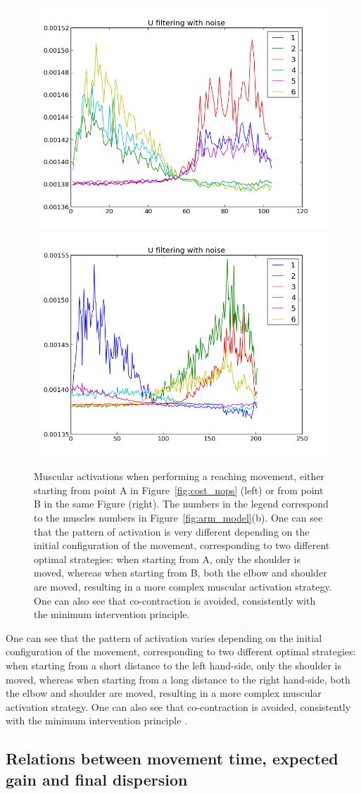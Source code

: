 \documentclass[10pt]{article}
\begin{document}
\begin{figure}[htp]
  \centering
\includegraphics[width=.449\columnwidth]{images/muscles_right2}
\includegraphics[width=.449\columnwidth]{images/muscles_left1}
  \caption{Muscular activations when performing a reaching movement, either starting from point A in Figure~\ref{fig:cost_nops} (left) or from point B in the same Figure (right).
The numbers in the legend correspond to the muscles numbers in Figure~\ref{fig:arm_model}(b).
One can see that the pattern of activation is very different depending on the initial configuration of the movement, corresponding to two different optimal strategies: when starting from A, only the shoulder is moved, whereas when starting from B, both the elbow and shoulder are moved, resulting in a more complex muscular activation strategy. One can also see that co-contraction is avoided, consistently with the minimum intervention principle.
\label{fig:muscles_LR}}
\end{figure}

One can see that the pattern of activation varies depending on the initial configuration of the movement, corresponding to two different optimal strategies: when starting from a short distance to the left hand-side, only the shoulder is moved, whereas when starting from a long distance to the right hand-side, both the elbow and shoulder are moved, resulting in a more complex muscular activation strategy. One can also see that co-contraction is avoided, consistently with the minimum intervention principle \cite{todorov02_NN}.

\subsection{Relations between movement time, expected gain and final dispersion}
\label{sec:time_perf}
\end{document}
